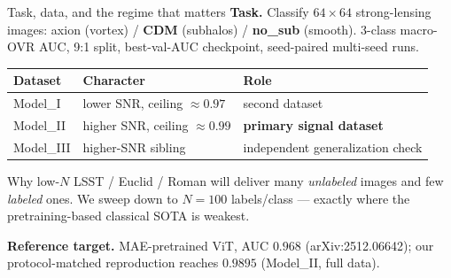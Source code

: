 \documentclass[aspectratio=169,10pt]{beamer}
\newcommand{\qq}[1]{\textcolor{q}{#1}}
\begin{document}
\begin{frame}{Task, data, and the regime that matters}
\textbf{Task.} Classify $64\times64$ strong-lensing images:
\qq{axion} (vortex) / \textbf{CDM} (subhalos) / \textbf{no\_sub} (smooth).
3-class macro-OVR AUC, 9:1 split, best-val-AUC checkpoint, seed-paired multi-seed runs.
\smallskip

\footnotesize
\begin{tabular}{@{}lll@{}}
\toprule
Dataset & Character & Role \\
\midrule
Model\_I   & lower SNR, ceiling $\approx0.97$ & second dataset \\
Model\_II  & higher SNR, ceiling $\approx0.99$ & \textbf{primary signal dataset} \\
Model\_III & higher-SNR sibling & independent generalization check \\
\bottomrule
\end{tabular}
\normalsize
\smallskip

\begin{block}{Why low-$N$}
LSST / Euclid / Roman will deliver many \emph{unlabeled} images and few
\emph{labeled} ones. We sweep down to $N{=}100$ labels/class --- exactly where the
pretraining-based classical SOTA is weakest.
\end{block}

\footnotesize
\textbf{Reference target.} MAE-pretrained ViT, AUC $0.968$ (arXiv:2512.06642);
our protocol-matched reproduction reaches $0.9895$ (Model\_II, full data).
\end{frame}
\end{document}
